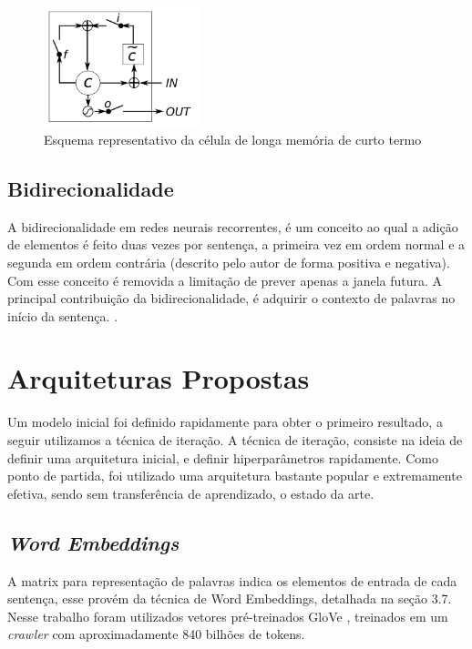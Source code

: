 \documentclass[12pt]{article}
\begin{document}
\begin{figure}[!htb]
\centering
\includegraphics[width=0.4\textwidth]{images/lstm_gate.png}
\caption{Esquema representativo da célula de longa memória de curto termo \cite{DBLP:journals/corr/ChungGCB14}}
\label{fig:lstm_date}
\end{figure}

\subsection{Bidirecionalidade}
    A bidirecionalidade em redes neurais recorrentes, é um conceito ao qual a adição de elementos é feito duas vezes por sentença, a primeira vez em ordem normal e a segunda em ordem contrária (descrito pelo autor de forma positiva e negativa). Com esse conceito é removida a limitação de prever apenas a janela futura. A principal contribuição da bidirecionalidade, é adquirir o contexto de palavras no início da sentença. \cite{schuster1997bidirectional}.

\section{Arquiteturas Propostas}

Um modelo inicial foi definido rapidamente para obter o primeiro resultado, a seguir utilizamos a técnica de iteração. A técnica de iteração, consiste na ideia de definir uma arquitetura inicial, e definir hiperparâmetros rapidamente. Como ponto de partida, foi utilizado uma arquitetura bastante popular e extremamente efetiva, sendo sem transferência de aprendizado, o estado da arte.

\subsection{\textit{Word Embeddings}}

A matrix para representação de palavras indica os elementos de entrada de cada sentença, esse provém da técnica de Word Embeddings, detalhada na seção 3.7. Nesse trabalho foram utilizados vetores pré-treinados GloVe \cite{pennington2014glove}, treinados em um \textit{crawler} com aproximadamente 840 bilhões de tokens.
\end{document}
